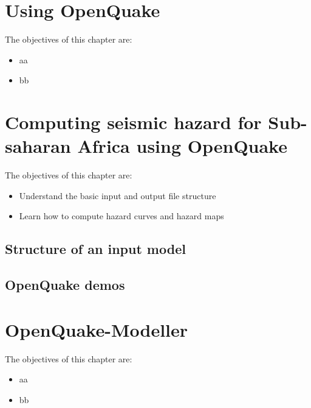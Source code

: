 \documentclass[11pt,a4paper,headings=small,dvips]{scrbook}
\newenvironment{myfancybox}{%
  \def\FrameCommand{\fboxsep=\FrameSep \fcolorbox{blue01}{honeydew}}%
  \color{black}\MakeFramed {\FrameRestore}}%
 {\endMakeFramed}
\begin{document}
\chapter{Using OpenQuake}
\begin{myfancybox}
The objectives of this chapter are:
\begin{itemize}
    \item aa
    \item bb
\end{itemize}
\end{myfancybox}
    
    
\chapter{Computing seismic hazard for Sub-saharan Africa using OpenQuake}
\begin{myfancybox}
The objectives of this chapter are:
\begin{itemize}
    \item Understand the basic input and output file structure
    \item Learn how to compute hazard curves and hazard maps
\end{itemize}
\end{myfancybox}
    
\section{Structure of an input model}
\section{OpenQuake demos}
\cleardoublepage
\chapter{OpenQuake-Modeller}
\begin{myfancybox}
The objectives of this chapter are:
\begin{itemize}
    \item aa
    \item bb
\end{itemize}
\end{myfancybox}
  
\cleardoublepage
\end{document}
